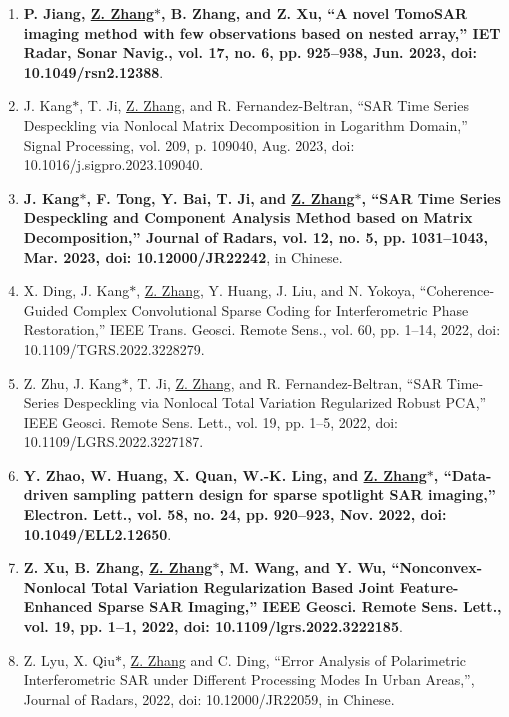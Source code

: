 \documentclass[paper=a4,fontsize=11pt]{scrartcl}
\begin{document}
\begin{enumerate}
\item \textbf{P. Jiang, \underline{Z. Zhang$\ast$}, B. Zhang, and Z. Xu, ``A novel TomoSAR imaging method with few observations based on nested array,'' IET Radar, Sonar Navig., vol. 17, no. 6, pp. 925–938, Jun. 2023, doi: 10.1049/rsn2.12388}.

\item J. Kang$\ast$, T. Ji, \underline{Z. Zhang}, and R. Fernandez-Beltran, ``SAR Time Series Despeckling via Nonlocal Matrix Decomposition in Logarithm Domain,'' Signal Processing, vol. 209, p. 109040, Aug. 2023, doi: 10.1016/j.sigpro.2023.109040.

\item \textbf{J. Kang$\ast$, F. Tong, Y. Bai, T. Ji, and \underline{Z. Zhang$\ast$}, ``SAR Time Series Despeckling and Component Analysis Method based on Matrix Decomposition,'' Journal of Radars, vol. 12, no. 5, pp. 1031–1043, Mar. 2023, doi: 10.12000/JR22242}, in Chinese.

\item X. Ding, J. Kang$\ast$, \underline{Z. Zhang}, Y. Huang, J. Liu, and N. Yokoya, ``Coherence-Guided Complex Convolutional Sparse Coding for Interferometric Phase Restoration,'' IEEE Trans. Geosci. Remote Sens., vol. 60, pp. 1–14, 2022, doi: 10.1109/TGRS.2022.3228279.

\item Z. Zhu, J. Kang$\ast$, T. Ji, \underline{Z. Zhang}, and R. Fernandez-Beltran, ``SAR Time-Series Despeckling via Nonlocal Total Variation Regularized Robust PCA,'' IEEE Geosci. Remote Sens. Lett., vol. 19, pp. 1–5, 2022, doi: 10.1109/LGRS.2022.3227187.​
	
\item \textbf{Y. Zhao, W. Huang, X. Quan, W.-K. Ling, and \underline{Z. Zhang$\ast$}, ``Data-driven sampling pattern design for sparse spotlight SAR imaging,'' Electron. Lett., vol. 58, no. 24, pp. 920–923, Nov. 2022, doi: 10.1049/ELL2.12650}.

\item \textbf{Z. Xu, B. Zhang, \underline{Z. Zhang$\ast$}, M. Wang, and Y. Wu, ``Nonconvex-Nonlocal Total Variation Regularization Based Joint Feature-Enhanced Sparse SAR Imaging,'' IEEE Geosci. Remote Sens. Lett., vol. 19, pp. 1–1, 2022, doi: 10.1109/lgrs.2022.3222185}.

\item Z. Lyu, X. Qiu$\ast$, \underline{Z. Zhang} and C. Ding, ``Error Analysis of Polarimetric Interferometric SAR under Different Processing Modes In Urban Areas,'', Journal of Radars, 2022, doi: 10.12000/JR22059, in Chinese.


\end{enumerate}
\end{document}
